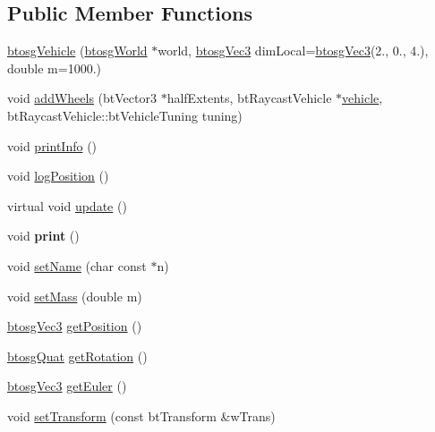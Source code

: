 \subsection*{Public Member Functions}
\begin{DoxyCompactItemize}
\item 
\mbox{\hyperlink{classbtosgVehicle_aa754dd94553b8690763e4c24d1f26227}{btosg\+Vehicle}} (\mbox{\hyperlink{classbtosgWorld}{btosg\+World}} $\ast$world, \mbox{\hyperlink{classbtosgVec3}{btosg\+Vec3}} dim\+Local=\mbox{\hyperlink{classbtosgVec3}{btosg\+Vec3}}(2., 0., 4.), double m=1000.)
\item 
void \mbox{\hyperlink{classbtosgVehicle_a98971fb952c08cb72341a0c333fc66de}{add\+Wheels}} (bt\+Vector3 $\ast$half\+Extents, bt\+Raycast\+Vehicle $\ast$\mbox{\hyperlink{classbtosgVehicle_ac45b117f8b523f7040de99639deb7522}{vehicle}}, bt\+Raycast\+Vehicle\+::bt\+Vehicle\+Tuning tuning)
\item 
void \mbox{\hyperlink{classbtosgVehicle_abe98f64f0a8f37c7c0b244e3afbbcb15}{print\+Info}} ()
\item 
void \mbox{\hyperlink{classbtosgVehicle_ae9168c62263b26f95d068d94d6a7cab7}{log\+Position}} ()
\item 
virtual void \mbox{\hyperlink{classbtosgVehicle_a5fd0f471df492ac232c9b772a28bd2b9}{update}} ()
\item 
\mbox{\label{classbtosgObject_a4432b5c28097065e89e045a8d02c45e6}} 
void {\bfseries print} ()
\item 
void \mbox{\hyperlink{classbtosgObject_ab06a1b3f357209214c6440cd5746523e}{set\+Name}} (char const $\ast$n)
\item 
void \mbox{\hyperlink{classbtosgObject_a91da93c82d48b86192f0cbb16054fe57}{set\+Mass}} (double m)
\item 
\mbox{\hyperlink{classbtosgVec3}{btosg\+Vec3}} \mbox{\hyperlink{classbtosgObject_a3dadd5da8f2a312e44a039446b93d4cd}{get\+Position}} ()
\item 
\mbox{\hyperlink{classbtosgQuat}{btosg\+Quat}} \mbox{\hyperlink{classbtosgObject_a3b825999ad3a51bde743d4085ff19dae}{get\+Rotation}} ()
\item 
\mbox{\hyperlink{classbtosgVec3}{btosg\+Vec3}} \mbox{\hyperlink{classbtosgObject_a2019ec63bde02b72600450c7c985e77a}{get\+Euler}} ()
\item 
void \mbox{\hyperlink{classbtosgObject_ad33fcab26c0c83ccab6dca6906e8cdb0}{set\+Transform}} (const bt\+Transform \&w\+Trans)
\item 

\end{DoxyCompactItemize}
